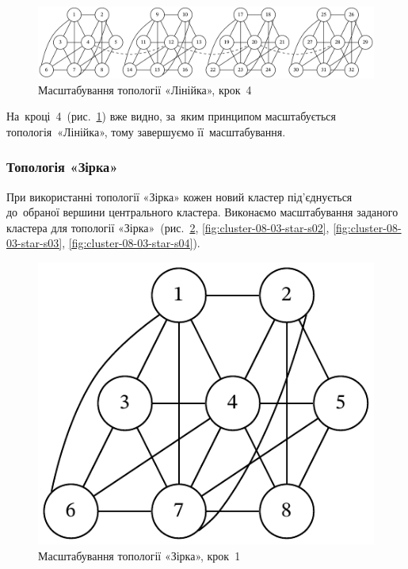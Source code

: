 \documentclass[
	a4paper,
	oneside,
	BCOR = 10mm,
	DIV = 12,
	12pt,
	headings = normal,
]{scrartcl}
\begin{document}
				\begin{figure}[!htbp]
					\centering
					\includegraphics[width=\columnwidth]{./assets/cluster-08-02-line-s04.pdf}
					\caption{Масштабування топології «Лінійка», крок~4}
					\label{fig:cluster-08-02-line-s04}
				\end{figure}

				На~кроці~4~(рис.~\ref{fig:cluster-08-02-line-s04}) вже видно, за~яким принципом масштабується топологія~«Лінійка», тому завершуємо її~масштабування.

			\subsubsection{Топологія «Зірка»}
				При використанні топології «Зірка» кожен новий кластер під'єднується до~обраної вершини центрального кластера. Виконаємо масштабування заданого кластера для топології «Зірка»~(рис.~\ref{fig:cluster-08-03-star-s01}, \ref{fig:cluster-08-03-star-s02}, \ref{fig:cluster-08-03-star-s03}, \ref{fig:cluster-08-03-star-s04}).

				\begin{figure}[!htbp]
					\centering
					\includegraphics[height=6\baselineskip]{./assets/cluster-08-01-named.pdf}
					\caption{Масштабування топології «Зірка», крок~1}
					\label{fig:cluster-08-03-star-s01}
				\end{figure}
\end{document}
